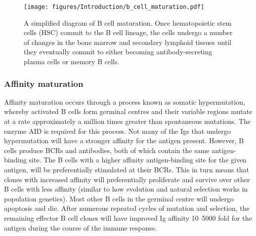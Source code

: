 \begin{figure}[htb]
\centering\texttt{[image: figures/Introduction/b\_cell\_maturation.pdf]}
\caption[B cell maturation]{A simplified diagram of B cell maturation.
Once hematopoietic stem cells (HSC) commit to the B cell lineage, the cells undergo a number of changes in the bone marrow and secondary lymphoid tissues until they eventually commit to either becoming antibody-secreting plasma cells or memory B cells.
}
\label{fig:b_cell_mat}\end{figure}

\subsubsection{Affinity maturation}
Affinity maturation occurs through a process known as somatic hypermutation, whereby activated B cells form germinal centres and their variable regions mutate at a rate approximately a million times greater than spontaneous mutations.
The enzyme AID is required for this process.
Not many of the Igs that undergo hypermutation will have a stronger affinity for the antigen present.
However, B cells produce BCRs and antibodies, both of which contain the same antigen-binding site.
The B cells with a higher affinity antigen-binding site for the given antigen, will be preferentially stimulated at their BCRs.
This in turn means that clones with increased affinity will preferentially proliferate and survive over other B cells with less affinity (similar to how evolution and natural selection works in population genetics).
Most other B cells in the germinal centre will undergo apoptosis and die.
After numerous repeated cycles of mutation and selection, the remaining effector B cell clones will have improved Ig affinity 10--5000 fold for the antigen during the course of the immune response\cite{mishra2018insights}.

